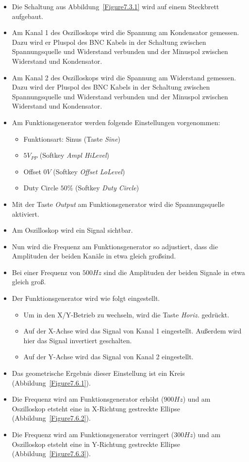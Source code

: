 \documentclass[12pt,a4paper,titlepage]{article}
\begin{document}
\begin{itemize}
  \item Die Schaltung aus Abbildung~\ref{Figure7.3.1} wird auf einem Steckbrett aufgebaut.
  \item Am Kanal 1 des Oszilloskops wird die Spannung am Kondensator gemessen. Dazu wird er Pluspol des BNC Kabels in der Schaltung zwischen Spannungsquelle und Widerstand verbunden und der Minuspol zwischen Widerstand und Kondensator.
  \item Am Kanal 2 des Oszilloskops wird die Spannung am Widerstand gemessen. Dazu wird der Pluspol des BNC Kabels in der Schaltung zwischen Spannungsquelle und Widerstand verbunden und der Minuspol zwischen Widerstand und Kondensator.
  \item Am Funktionsgenerator werden folgende Einstellungen vorgenommen:
  \begin{itemize}
    \item Funktionsart: Sinus (Taste \textit{Sine})
    \item $5 V_{PP}$ (Softkey \textit{Ampl HiLevel})
    \item Offset $0 V$ (Softkey \textit{Offset LoLevel})
    \item Duty Circle $50 \%$ (Softkey \textit{Duty Circle})
  \end{itemize}
  \item Mit der Taste \textit{Output} am Funktionsgenerator wird die Spannungsquelle aktiviert.
  \item Am Oszilloskop wird ein Signal sichtbar.
  \item Nun wird die Frequenz am Funktionsgenerator so adjustiert, dass die Amplituden der beiden Kan\"ale in etwa gleich gro\ss  sind.
  \item Bei einer Frequenz von $500 Hz$ sind die Amplituden der beiden Signale in etwa gleich gro\ss .
  \item Der Funktionsgenerator wird wie folgt eingestellt.
  \begin{itemize}
    \item Um in den X/Y-Betrieb zu wechseln, wird die Taste \textit{Horiz.} gedr\"uckt.
    \item Auf der X-Achse wird das Signal von Kanal 1 eingestellt. Au\ss erdem wird hier das Signal invertiert geschalten.
    \item Auf der Y-Achse wird das Signal von Kanal 2 eingestellt.
  \end{itemize}
  \item Das geometrische Ergebnis dieser Einstellung ist ein Kreis (Abbildung~\ref{Figure7.6.1}).
  \item Die Frequenz wird am Funktionsgenerator erh\"oht ($900 Hz$) und am Oszilloskop etsteht eine in X-Richtung gestreckte Ellipse (Abbildung~\ref{Figure7.6.2}).
  \item Die Frequenz wird am Funktionsgenerator verringert ($300 Hz$) und am Oszilloskop etsteht eine in Y-Richtung gestreckte Ellipse (Abbildung~\ref{Figure7.6.3}).
\end{itemize}
\end{document}
